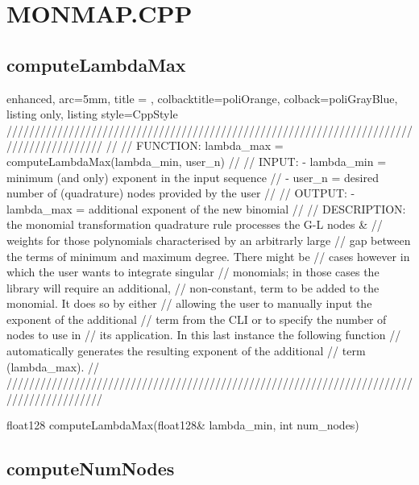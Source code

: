 \documentclass[a4paper, twosided]{book}
\begin{document}
\newpage
\section[MonMap.cpp]{\changefont MONMAP.CPP}\label{Sec4.1}

\subsection[computeLambdaMax]{\changefont computeLambdaMax}\label{SubSec4.1.1}

\begin{tcblisting}{enhanced,
                   arc=5mm,
                   title = \color{black}{\large \ttfamily MonMap.cpp/computeLambdaMax},
                   colbacktitle=poliOrange,
                   colback=poliGrayBlue,
                   listing only,
                   listing style=CppStyle}
/////////////////////////////////////////////////////////////////////////////////////////
//
//       FUNCTION: lambda_max = computeLambdaMax(lambda_min, user_n)
//                
//          INPUT: - lambda_min = minimum (and only) exponent in the input sequence
//                 - user_n = desired number of (quadrature) nodes provided by the user
//
//         OUTPUT: - lambda_max = additional exponent of the new binomial
//
//    DESCRIPTION: the monomial transformation quadrature rule processes the G-L nodes & 
//                 weights for those polynomials characterised by an arbitrarly large
//                 gap between the terms of minimum and maximum degree. There might be
//                 cases however in which the user wants to integrate singular 
//                 monomials; in those cases the library will require an additional, 
//                 non-constant, term to be added to the monomial. It does so by either 
//                 allowing the user to manually input the exponent of the additional
//                 term from the CLI or to specify the number of nodes to use in
//                 its application. In this last instance the following function 
//                 automatically generates the resulting exponent of the additional
//                 term (lambda_max).
//
/////////////////////////////////////////////////////////////////////////////////////////

float128 computeLambdaMax(float128& lambda_min, int num_nodes)
\end{tcblisting}

\subsection[computeNumNodes]{\changefont computeNumNodes}\label{SubSec4.1.2}
\end{document}
